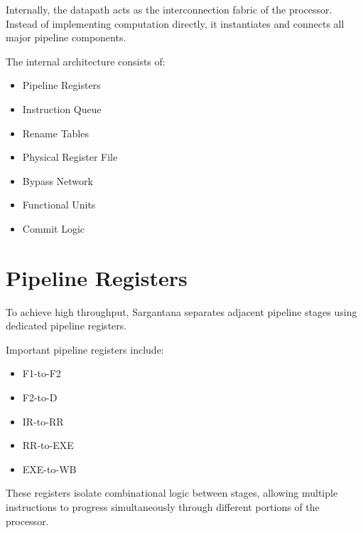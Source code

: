Internally, the datapath acts as the interconnection fabric of the processor.
Instead of implementing computation directly, it instantiates and connects all major pipeline
components.

The internal architecture consists of:
\begin{itemize}
  \item Pipeline Registers
  \item Instruction Queue
  \item Rename Tables
  \item Physical Register File
  \item Bypass Network
  \item Functional Units
  \item Commit Logic
\end{itemize}

\section{Pipeline Registers}

To achieve high throughput, Sargantana separates adjacent pipeline stages using dedicated
pipeline registers.

Important pipeline registers include:
\begin{itemize}
  \item F1-to-F2
  \item F2-to-D
  \item IR-to-RR
  \item RR-to-EXE
  \item EXE-to-WB
\end{itemize}

These registers isolate combinational logic between stages, allowing multiple instructions to
progress simultaneously through different portions of the processor.
